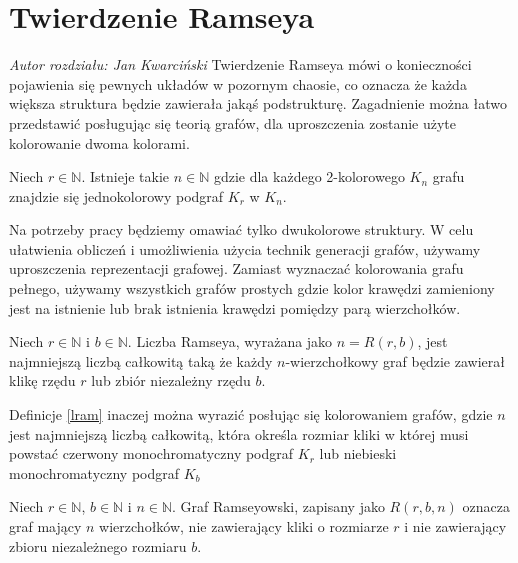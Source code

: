 \chapter{Twierdzenie Ramseya}
\textit{Autor rozdziału: Jan Kwarciński}
\vspace{0.5cm}\newline
Twierdzenie Ramseya mówi o konieczności pojawienia się pewnych układów w pozornym chaosie\cite{dickson}, co oznacza że każda większa struktura będzie zawierała jakąś podstrukturę. Zagadnienie można łatwo przedstawić posługując się teorią grafów, dla uproszczenia zostanie użyte kolorowanie dwoma kolorami.

\begin{theorem}
Niech $r \in \mathbb{N}$. Istnieje takie $n \in \mathbb{N}$  gdzie dla każdego 2-kolorowego $\mathit{K}_{n}$ grafu znajdzie się jednokolorowy podgraf $\mathit{K}_{r}$ w $\mathit{K}_{n}$.  \cite{theory} 
\end{theorem}

Na potrzeby pracy będziemy omawiać tylko dwukolorowe struktury. W celu ułatwienia obliczeń i umożliwienia użycia technik generacji grafów, używamy uproszczenia reprezentacji grafowej. Zamiast wyznaczać kolorowania grafu pełnego, używamy wszystkich grafów prostych gdzie kolor krawędzi zamieniony jest na istnienie lub brak istnienia krawędzi pomiędzy parą wierzchołków.

\begin{definition}
Niech $r \in \mathbb{N}$ i $b \in \mathbb{N}$. Liczba Ramseya, wyrażana jako $n = R(r,b)$, jest najmniejszą liczbą całkowitą taką że każdy $n$-wierzchołkowy graf będzie zawierał klikę rzędu $r$ lub zbiór niezależny rzędu $b$.
  \cite{mainpaper} 
  \label{lram}
\end{definition}

Definicje \ref{lram} inaczej można wyrazić posłując się kolorowaniem grafów, gdzie $n$ jest najmniejszą liczbą całkowitą, która określa rozmiar kliki w której musi powstać czerwony monochromatyczny podgraf $\mathit{K}_{r}$ lub niebieski monochromatyczny podgraf $\mathit{K}_{b}$

\begin{definition}
Niech $r \in \mathbb{N}$, $b \in \mathbb{N}$ i $n \in \mathbb{N}$. Graf Ramseyowski, zapisany jako $R(r,b,n)$ oznacza graf mający $n$ wierzchołków, nie zawierający kliki o rozmiarze $r$ i nie zawierający zbioru niezależnego rozmiaru $b$.  \cite{mainpaper} 
\label{gram}
\end{definition}

